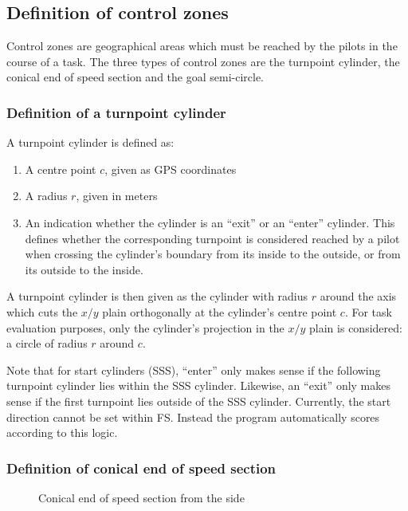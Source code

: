 \documentclass{article}
\begin{document}
\subsection{Definition of control zones}
Control zones are geographical areas which must be reached by the pilots in the
course of a task. The three types of control zones are the turnpoint cylinder,
the conical end of speed section and the goal semi-circle.

\subsubsection{Definition of a turnpoint cylinder}
A turnpoint cylinder is defined as:
\begin{enumerate}
    \item A centre point \(c\), given as GPS coordinates
    \item A radius \(r\), given in meters
    \item
        An indication whether the cylinder is an “exit” or an “enter” cylinder.
        This defines whether the corresponding turnpoint is considered reached
        by a pilot when crossing the cylinder’s boundary from its inside to the
        outside, or from its outside to the inside.
\end{enumerate}

A turnpoint cylinder is then given as the cylinder with radius \(r\) around the
axis which cuts the \(x/y\) plain orthogonally at the cylinder’s centre point
\(c\).  For task evaluation purposes, only the cylinder’s projection in the
\(x/y\) plain is considered: a circle of radius \(r\) around \(c\).

Note that for start cylinders (SSS), “enter” only makes sense if the following
turnpoint cylinder lies within the SSS cylinder. Likewise, an “exit” only makes
sense if the first turnpoint lies outside of the SSS cylinder. Currently, the
start direction cannot be set within FS. Instead the program automatically
scores according to this logic.

\subsubsection{Definition of conical end of speed section}
\label{sec:define-CESS}

\begin{figure}[h]
    \centering
    
    \caption{Conical end of speed section from the side}
\end{figure}
\end{document}
